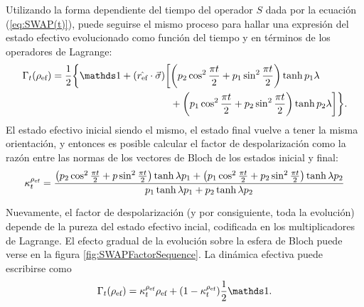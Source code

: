 Utilizando la forma dependiente del tiempo del operador $S$ dada por la ecuación (\ref{eq:SWAP(t)}), puede seguirse el mismo proceso para hallar una expresión del estado efectivo evolucionado como función del tiempo y en términos de los operadores de Lagrange:
\begin{align}
  \begin{split}
  \Gamma_{t}(\rho_{\ef})=\frac{1}{2}\bigg\{\Id+(\hat{r_{\ef}}\cdot\vec{\sigma})\bigg[&\qty(p_{2}\cos^{2}{\frac{\pi t}{2}}+p_{1}\sin^{2}{\frac{\pi t}{2}})\tanh{p_{1}\lambda}\\
  &+\qty(p_{1}\cos^{2}{\frac{\pi t}{2}}+p_{2}\sin^{2}{\frac{\pi t}{2}})\tanh{p_{2}\lambda}\bigg]\bigg\}.
  \end{split}
\end{align}
El estado efectivo inicial siendo el mismo, el estado final vuelve a tener la misma orientación, y entonces es posible calcular el factor de despolarización como la razón entre las normas de los vectores de Bloch de los estados inicial y final:
\begin{equation}\label{eq:SWAPFactort}
  \kappa_{t}^{\rho_{\text{ef}}}=\frac{\qty(p_{2}\cos^{2}{\frac{\pi t}{2}}+p\sin^{2}{\frac{\pi t}{2}})\tanh{\lambda p_{1}}+\qty(p_{1}\cos^{2}{\frac{\pi t}{2}}+p_{2}\sin^{2}{\frac{\pi t}{2}})\tanh{\lambda p_{2}}}{
    p_{1}\tanh{\lambda p_{1}}+p_{2}\tanh{\lambda p_{2}}}
\end{equation}

Nuevamente, el factor de despolarización (y por consiguiente, toda la evolución) depende de la pureza del estado efectivo incial, codificada en los multiplicadores de Lagrange. El efecto gradual de la evolución sobre la esfera de Bloch puede verse en la figura \ref{fig:SWAPFactorSequence}. La dinámica efectiva puede escribirse como
\begin{equation}\label{eq:EffectiveSWAPt}
  \Gamma_{t}(\rho_{\ef})=\kappa_{t}^{\rho_{\ef}}\rho_{\ef}+(1-\kappa_{t}^{\rho_{\ef}})\frac{1}{2}\Id.
\end{equation}

